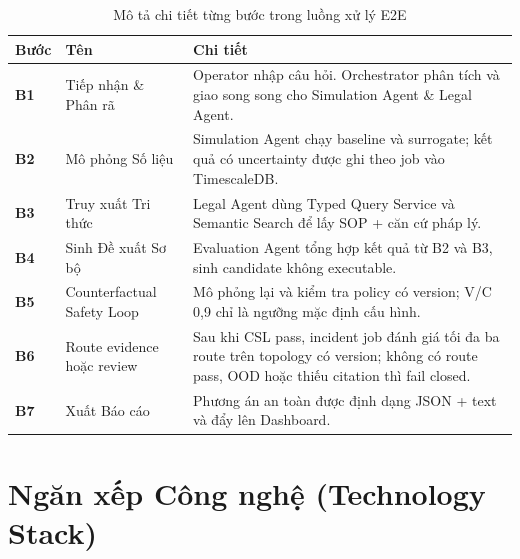 \begin{table}[H]
\centering
\caption{Mô tả chi tiết từng bước trong luồng xử lý E2E}
\label{tab:workflow}
\renewcommand{\arraystretch}{1.4}
\begin{tabular}{>{\bfseries\centering}p{1.5cm} p{4cm} p{6.5cm}}
\toprule
\textbf{Bước} & \textbf{Tên} & \textbf{Chi tiết} \\
\midrule
B1 & Tiếp nhận \& Phân rã & Operator nhập câu hỏi. Orchestrator phân tích và giao song song cho Simulation Agent \& Legal Agent. \\
\rowcolor{rowgray}
B2 & Mô phỏng Số liệu & Simulation Agent chạy baseline và surrogate; kết quả có uncertainty được ghi theo job vào TimescaleDB. \\
B3 & Truy xuất Tri thức & Legal Agent dùng Typed Query Service và Semantic Search để lấy SOP + căn cứ pháp lý. \\
\rowcolor{rowgray}
B4 & Sinh Đề xuất Sơ bộ & Evaluation Agent tổng hợp kết quả từ B2 và B3, sinh candidate không executable. \\
B5 & Counterfactual Safety Loop & Mô phỏng lại và kiểm tra policy có version; V/C 0,9 chỉ là ngưỡng mặc định cấu hình. \\
\rowcolor{rowgray}
B6 & Route evidence hoặc review & Sau khi CSL pass, incident job đánh giá tối đa ba route trên topology có version; không có route pass, OOD hoặc thiếu citation thì fail closed. \\
B7 & Xuất Báo cáo & Phương án an toàn được định dạng JSON + text và đẩy lên Dashboard. \\
\bottomrule
\end{tabular}
\end{table}

\section{Ngăn xếp Công nghệ (Technology Stack)}

